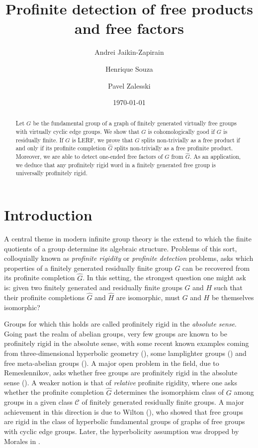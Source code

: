 \documentclass[a4paper]{amsart}
\title{Profinite detection of free products and free factors}
\author{Andrei Jaikin-Zapirain}
\author{Henrique Souza }
\author{Pavel Zalesski}
\date{\today}
\theoremstyle{definition}
\theoremstyle{remark}
\begin{document}
\begin{abstract} Let \(G\) be the fundamental group of a graph of finitely generated virtually free groups with virtually cyclic edge groups. We show that \(G\) is cohomologically good if \(G\) is residually finite. If \(G\) is LERF, we prove that \(G\) splits non-trivially as a free product if and only if its profinite completion \(\widehat{G}\) splits non-trivially as a free profinite product. Moreover, we are able to detect one-ended free factors of \(G\) from \(\widehat{G}\). As an application, we deduce that any profinitely rigid word in a finitely generated free group is universally profinitely rigid.
\end{abstract}

\maketitle



\section{Introduction}

A central theme in modern infinite group theory is the extend to which the finite quotients of a group determine its algebraic structure. Problems of this sort, colloquially known as \emph{profinite rigidity} or \emph{profinite detection} problems, asks which properties of a finitely generated residually finite group \(G\) can be recovered from its profinite completion \(\widehat{G}\). In this setting, the strongest question one might ask is: given two finitely generated and residually finite groups \(G\) and \(H\) such that their profinite completions \(\widehat{G}\) and \(\widehat{H}\) are isomorphic, must \(G\) and \(H\) be themselves isomorphic?

Groups for which this holds are called profinitely rigid in the \emph{absolute sense}. Going past the realm of abelian groups, very few groups are known to be profinitely rigid in the absolute sense, with some recent known examples coming from three-dimensional hyperbolic geometry (\cite{bridson_absolute_2020,bridson_profinite_2021}), some lamplighter groups (\cite{blachar_profinite_2025}) and free meta-abelian groups (\cite{wykowski2025profiniterigidityfreemetabelian}). A major open problem in the field, due to Remeslennikov, asks whether free groups are profinitely rigid in the absolute sense  (\cite[Problem 5.48]{leifman_kourovka_1983}). A weaker notion is that of \emph{relative} profinite rigidity, where one asks whether the profinite completion \(\widehat{G}\) determines the isomorphism class of \(G\) among groups in a given class \(\mathcal{C}\) of finitely generated residually finite groups. A major achievement in this direction is due to Wilton (\cite{Wi18}), who showed that free groups are rigid in the class of hyperbolic fundamental groups of graphs of free groups with cyclic edge groups. Later, the hyperbolicity assumption was dropped by Morales in \cite{moralesProfiniteRigidityFree2024}.
\end{document}
